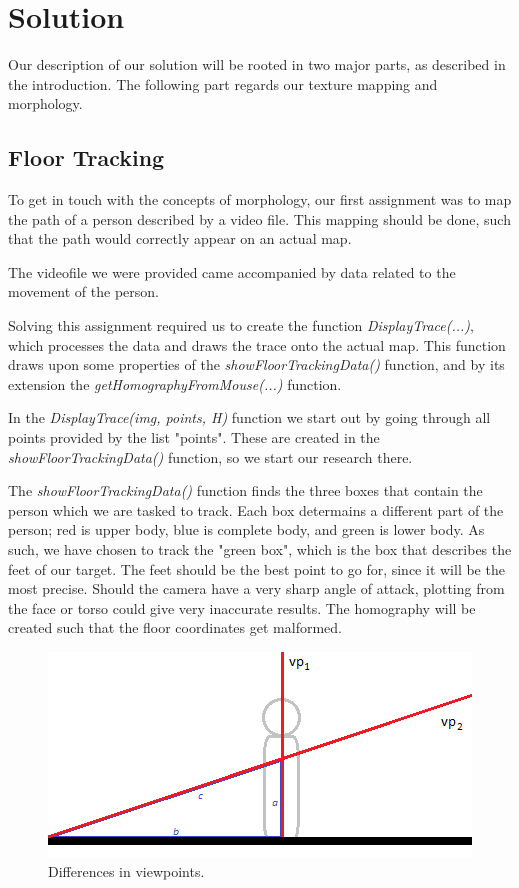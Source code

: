 \section{Solution}
Our description of our solution will be rooted in two major parts, as described in the introduction.
The following part regards our texture mapping and morphology.\newline

\subsection{Floor Tracking}
To get in touch with the concepts of morphology, our first assignment was to map the path of a person described by a video file. This mapping should be done, such that the path would correctly appear on an actual map.\newline

The videofile we were provided came accompanied by data related to the movement of the person.\newline

Solving this assignment required us to create the function \textsl{DisplayTrace(...)}, which processes the data and draws the trace onto the actual map. This function draws upon some properties of the \textsl{showFloorTrackingData()} function, and by its extension the \textsl{getHomographyFromMouse(...)} function.\newline

In the \textsl{DisplayTrace(img, points, H)} function we start out by going through all points provided by the list "points". These are created in the \textsl{showFloorTrackingData()} function, so we start our research there.\newline

The \textsl{showFloorTrackingData()} function finds the three boxes that contain the person which we are tasked to track. Each box determains a different part of the person; red is upper body, blue is complete body, and green is lower body. As such, we have chosen to track the "green box", which is the box that describes the feet of our target.
The feet should be the best point to go for, since it will be the most precise. Should the camera have a very sharp angle of attack, plotting from the face or torso could give very inaccurate results. The homography will be created such that the floor coordinates get malformed.\newline

\begin{figure}
	\centering
	\includegraphics[scale=0.9]{images/viewpointdifference.png}
	\caption{Differences in viewpoints.}
	\label{fig:viewpoints}
\end{figure}

